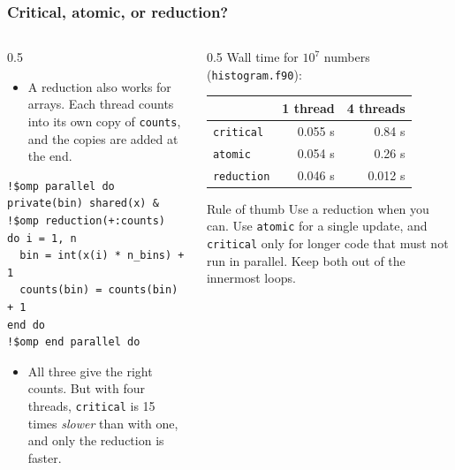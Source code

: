 \begin{frame}[fragile]
  \frametitle{Critical, atomic, or reduction?}
  \begin{columns}[T]
    \begin{column}{0.5\textwidth}
      \begin{itemize}
        \item A reduction also works for arrays. Each thread counts into its own copy of \texttt{counts}, and the copies are added at the end.
      \end{itemize}

      \begin{lstlisting}
!$omp parallel do private(bin) shared(x) &
!$omp reduction(+:counts)
do i = 1, n
  bin = int(x(i) * n_bins) + 1
  counts(bin) = counts(bin) + 1
end do
!$omp end parallel do
      \end{lstlisting}

      \vspace*{2mm}
      \begin{itemize}
        \item All three give the right counts. But with four threads, \texttt{critical} is 15 times \emph{slower} than with one, and only the reduction is faster.
      \end{itemize}
    \end{column}

    \begin{column}{0.5\textwidth}
      \centering
      Wall time for $10^7$ numbers (\texttt{histogram.f90}):

      \vspace*{2mm}
      \begin{tabular}{lrr}
        & \textbf{1 thread} & \textbf{4 threads} \\
        \hline
        \texttt{critical}  & 0.055 s & 0.84 s \\
        \texttt{atomic}    & 0.054 s & 0.26 s \\
        \texttt{reduction} & 0.046 s & 0.012 s \\
        \hline
      \end{tabular}

      \vspace*{4mm}
      \raggedright
      \begin{block}{Rule of thumb}
        Use a reduction when you can. Use \texttt{atomic} for a single update, and \texttt{critical} only for longer code that must not run in parallel. Keep both out of the innermost loops.
      \end{block}
    \end{column}
  \end{columns}
\end{frame}


